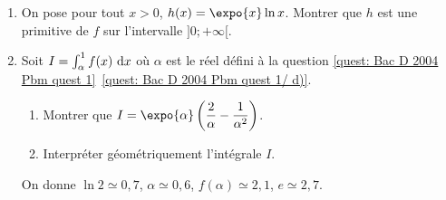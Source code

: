 \begin{enumerate}
\begin{enumerate}
                  \end{enumerate}
            \item On pose pour tout $x > 0$, $h(x) = \expo{x} \ln x$.
                  Montrer que $h$ est une primitive de $f$ sur l'intervalle $]0 ; +\infty[$.
            \item Soit $I = \int_{\alpha}^{1} f(x) ~\mathrm{d}x$ o\`u $\alpha$ est le r\'eel d\'efini \`a la question 
                  \ref{quest: Bac D 2004 Pbm quest 1}~\ref{quest: Bac D 2004 Pbm quest 1/ d)}.
                  \begin{enumerate}
                        \item Montrer que 
                              $\displaystyle{ I = \expo{\alpha} \left( \frac{2}{\alpha} - \frac{1}{\alpha^2} \right) }$.
                        \item Interpr\'eter g\'eom\'etriquement l'int\'egrale $I$.
                  \end{enumerate}
                  On donne $\ln 2 \simeq 0,7$, $\alpha \simeq 0,6$, $f(\alpha) \simeq 2,1$, $e \simeq 2,7$.
      \end{enumerate}






